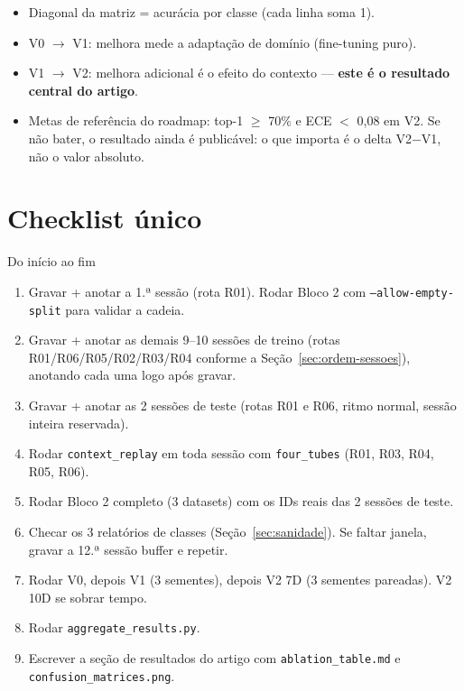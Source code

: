 \documentclass[11pt,a4paper]{article}
\begin{document}
\begin{itemize}[leftmargin=1.5em]
  \item Diagonal da matriz = acurácia por classe (cada linha soma 1).
  \item V0 $\to$ V1: melhora mede a adaptação de domínio (fine-tuning puro).
  \item V1 $\to$ V2: melhora adicional é o efeito do contexto --- \textbf{este é o resultado central do artigo}.
  \item Metas de referência do roadmap: top-1 $\geq$ 70\% e ECE $<$ 0,08 em V2. Se não bater, o resultado ainda é publicável: o que importa é o delta V2$-$V1, não o valor absoluto.
\end{itemize}

\section{Checklist único}

\begin{stepbox}{Do início ao fim}
\begin{enumerate}[leftmargin=1.5em]
  \item Gravar + anotar a 1.ª sessão (rota R01). Rodar Bloco 2 com \texttt{--allow-empty-split} para validar a cadeia.
  \item Gravar + anotar as demais 9--10 sessões de treino (rotas R01/R06/R05/R02/R03/R04 conforme a Seção~\ref{sec:ordem-sessoes}), anotando cada uma logo após gravar.
  \item Gravar + anotar as 2 sessões de teste (rotas R01 e R06, ritmo normal, sessão inteira reservada).
  \item Rodar \texttt{context\_replay} em toda sessão com \texttt{four\_tubes} (R01, R03, R04, R05, R06).
  \item Rodar Bloco 2 completo (3 datasets) com os IDs reais das 2 sessões de teste.
  \item Checar os 3 relatórios de classes (Seção~\ref{sec:sanidade}). Se faltar janela, gravar a 12.ª sessão buffer e repetir.
  \item Rodar V0, depois V1 (3 sementes), depois V2 7D (3 sementes pareadas). V2 10D se sobrar tempo.
  \item Rodar \texttt{aggregate\_results.py}.
  \item Escrever a seção de resultados do artigo com \texttt{ablation\_table.md} e \texttt{confusion\_matrices.png}.
\end{enumerate}
\end{stepbox}
\end{document}
